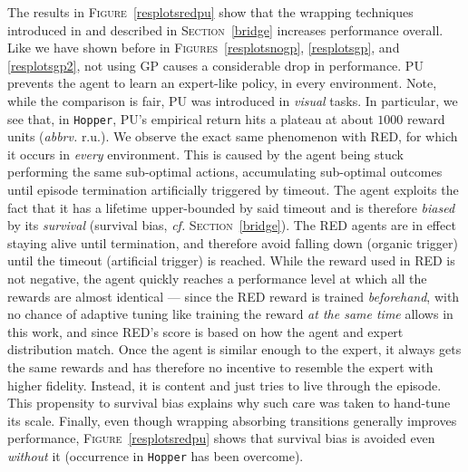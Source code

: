 The results in \textsc{Figure}~\ref{resplotsredpu}
show that the wrapping techniques introduced in \cite{Kostrikov2019-jo}
and described in \textsc{Section}~\ref{bridge}
increases performance overall.
Like we have shown before in \textsc{Figures}~\ref{resplotsnogp}, \ref{resplotsgp}, and \ref{resplotsgp2},
not using GP causes a considerable drop in performance.
PU prevents the agent to learn an expert-like policy, in every environment.
Note, while the comparison is fair, PU was introduced in \emph{visual} tasks.
In particular, we see that, in \texttt{Hopper}, PU's empirical return hits a plateau
at about $1000$ reward units (\textit{abbrv.} r.u.).
We observe the exact same phenomenon with RED, for which it occurs
in \emph{every} environment.
This is caused by the agent being stuck performing the same sub-optimal actions,
accumulating sub-optimal outcomes until episode termination artificially triggered by timeout.
The agent exploits the fact that it has a lifetime upper-bounded by said timeout
and is therefore \emph{biased} by its \emph{survival}
(survival bias, \textit{cf.} \textsc{Section}~\ref{bridge}).
The RED agents are in effect staying alive until termination,
and therefore avoid falling down (organic trigger) until the timeout (artificial trigger)
is reached.
While the reward used in RED is not negative, the agent quickly reaches a performance level
at which all the rewards are almost identical
--- since the RED reward is trained \emph{beforehand}, with no chance of adaptive tuning like
training the reward \emph{at the same time} allows in this work, and since
RED's score is based on how the agent and expert distribution match.
Once the agent is similar enough to the expert, it always gets the same rewards
and has therefore no incentive to resemble the expert with higher fidelity.
Instead, it is content and just tries to live through the episode.
This propensity to survival bias explains why such care was taken to hand-tune
its scale.
Finally, even though wrapping absorbing transitions generally improves performance,
\textsc{Figure}~\ref{resplotsredpu} shows that survival bias is avoided
even \emph{without} it (occurrence in \texttt{Hopper} has been overcome).

